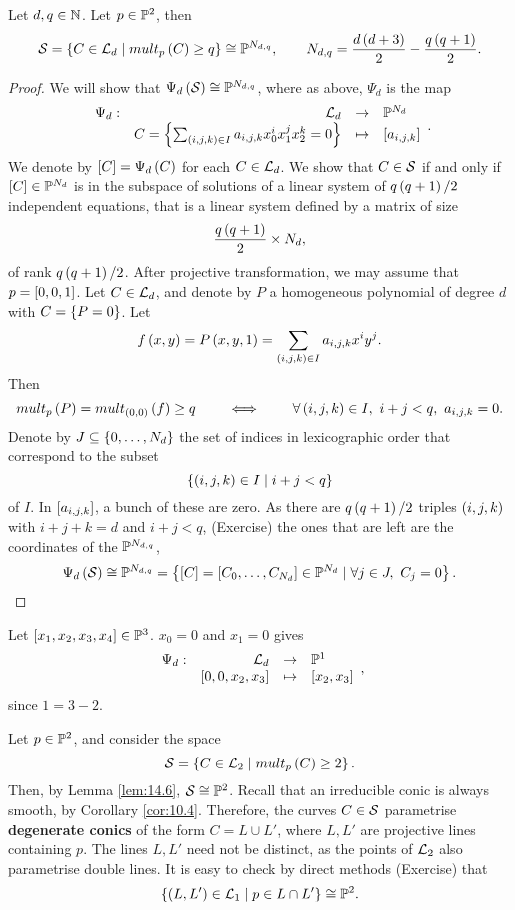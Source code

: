 \begin{lemma}
\label{lem:14.6}
Let $ d, q \in \N $. Let $ p \in \P^2 $, then
$$ \SS = \cb{C \in \LL_d \mid mult_p\rb{C} \ge q} \cong \P^{N_{d, q}}, \qquad N_{d, q} = \dfrac{d\rb{d + 3}}{2} - \dfrac{q\rb{q + 1}}{2}. $$
\end{lemma}

\begin{proof}
We will show that $ \Psi_d\rb{\SS} \cong \P^{N_{d, q}} $, where as above, $ \Psi_d $ is the map
$$ \function[\Psi_d]{\LL_d}{\P^{N_d}}{C = \cb{\sum_{\rb{i, j, k} \in I} a_{i, j, k}x_0^ix_1^jx_2^k = 0}}{\sb{a_{i, j, k}}}. $$
We denote by $ \sb{C} = \Psi_d\rb{C} $ for each $ C \in \LL_d $. We show that $ C \in \SS $ if and only if $ \sb{C} \in \P^{N_d} $ is in the subspace of solutions of a linear system of $ q\rb{q + 1} / 2 $ independent equations, that is a linear system defined by a matrix of size
$$ \dfrac{q\rb{q + 1}}{2} \times N_d, $$
of rank $ q\rb{q + 1} / 2 $. After projective transformation, we may assume that $ p = \sb{0, 0, 1} $. Let $ C \in \LL_d $, and denote by $ P $ a homogeneous polynomial of degree $ d $ with $ C = \cb{P = 0} $. Let
$$ f\rb{x, y} = P\rb{x, y, 1} =  \sum_{\rb{i, j, k} \in I} a_{i, j, k}x^iy^j. $$
Then
$$ mult_p\rb{P} = mult_{\rb{0, 0}}\rb{f} \ge q \qquad \iff \qquad \forall \rb{i, j, k} \in I, \ i + j < q, \ a_{i, j, k} = 0. $$
Denote by $ J \subseteq \cb{0, \dots, N_d} $ the set of indices in lexicographic order that correspond to the subset
$$ \cb{\rb{i, j, k} \in I \mid i + j < q} $$
of $ I $. In $ \sb{a_{i, j, k}} $, a bunch of these are zero. As there are $ q\rb{q + 1} / 2 $ triples $ \rb{i, j, k} $ with $ i + j + k = d $ and $ i + j < q $, (Exercise) the ones that are left are the coordinates of the $ \P^{N_{d, q}} $,
$$ \Psi_d\rb{\SS} \cong \P^{N_{d, q}} = \cb{\sb{C} = \sb{C_0, \dots, C_{N_d}} \in \P^{N_d} \mid \forall j \in J, \ C_j = 0}. $$
\end{proof}

\begin{example*}
Let $ \sb{x_1, x_2, x_3, x_4} \in \P^3 $. $ x_0 = 0 $ and $ x_1 = 0 $ gives
$$ \function[\Psi_d]{\LL_d}{\P^1}{\sb{0, 0, x_2, x_3}}{\sb{x_2, x_3}}, $$
since $ 1 = 3 - 2 $.
\end{example*}

\pagebreak

\begin{example}
Let $ p \in \P^2 $, and consider the space
$$ \SS = \cb{C \in \LL_2 \mid mult_p\rb{C} \ge 2}. $$
Then, by Lemma \ref{lem:14.6}, $ \SS \cong \P^2 $. Recall that an irreducible conic is always smooth, by Corollary \ref{cor:10.4}. Therefore, the curves $ C \in \SS $ parametrise \textbf{degenerate conics} of the form $ C = L \cup L' $, where $ L, L' $ are projective lines containing $ p $. The lines $ L, L' $ need not be distinct, as the points of $ \LL_2 $ also parametrise double lines. It is easy to check by direct methods (Exercise) that
$$ \cb{\rb{L, L'} \in \LL_1 \mid p \in L \cap L'} \cong \P^2. $$
\end{example}

